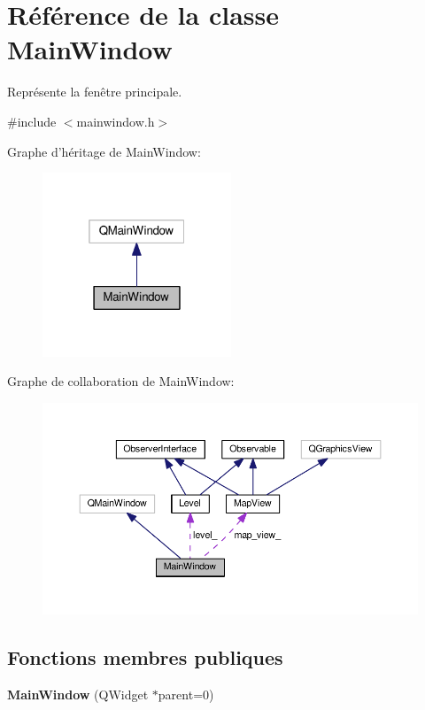 \hypertarget{classMainWindow}{\section{Référence de la classe Main\+Window}
\label{classMainWindow}
}


Représente la fenêtre principale.  




{\ttfamily \#include $<$mainwindow.\+h$>$}



Graphe d'héritage de Main\+Window\+:\nopagebreak
\begin{figure}[H]
\begin{center}
\leavevmode
\includegraphics[width=160pt]{d1/d96/classMainWindow__inherit__graph}
\end{center}
\end{figure}


Graphe de collaboration de Main\+Window\+:\nopagebreak
\begin{figure}[H]
\begin{center}
\leavevmode
\includegraphics[width=350pt]{d2/d38/classMainWindow__coll__graph}
\end{center}
\end{figure}
\subsection*{Fonctions membres publiques}
\begin{DoxyCompactItemize}
\item 
\hypertarget{classMainWindow_a8b244be8b7b7db1b08de2a2acb9409db}{{\bfseries Main\+Window} (Q\+Widget $\ast$parent=0)}\label{classMainWindow_a8b244be8b7b7db1b08de2a2acb9409db}

\end{DoxyCompactItemize}
